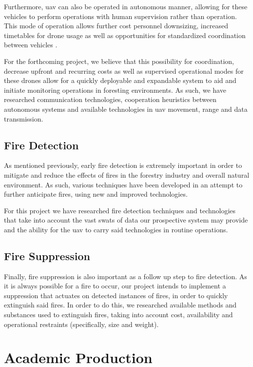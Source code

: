 \documentclass[runningheads]{llncs}
\begin{document}
Furthermore, \acrshort{uav} can also be operated in autonomous manner, allowing for these vehicles to perform operations with human supervision rather than operation.  This mode of operation allows further cost personnel downsizing, increased timetables for drone usage as well as opportunities for standardized coordination between vehicles \cite{article12}.

For the forthcoming project, we believe that this possibility for coordination, decrease upfront and recurring costs as well as supervised operational modes for these drones allow for a quickly deployable and expandable system to aid and initiate monitoring operations in foresting environments. As such, we have researched communication technologies, cooperation heuristics between autonomous systems and available technologies in \acrshort{uav} movement, range and data transmission.

\subsection{Fire Detection}

As mentioned previously, early fire detection is extremely important in order to mitigate and reduce the effects of fires in the forestry industry and overall natural environment. As such, various techniques have been developed in an attempt to further anticipate fires, using new and improved technologies.

For this project we have researched fire detection techniques and technologies that take into account the vast swats of data our prospective system may provide and the ability for the \acrshort{uav} to carry said technologies in routine operations.


\subsection{Fire Suppression}

Finally, fire suppression is also important as a follow up step to fire detection. As it is always possible for a fire to occur, our project intends to implement a suppression that actuates on detected instances of fires, in order to quickly extinguish said fires. In order to do this, we researched available methods and substances used to extinguish fires, taking into account cost, availability and operational restraints (specifically, size and weight).


\section{Academic Production}
\end{document}
